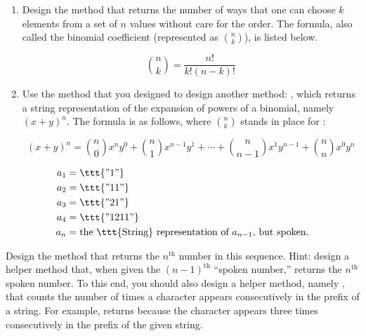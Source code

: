 \begin{enumerate}[label=(\alph*)]
    \item Design the  method that returns the number of ways that one can choose $k$ elements from a set of $n$ values without care for the order. The formula, also called the binomial coefficient (represented as $\binom{n}{k}$), is listed below.
    
\[
    \binom{n}{k} = \dfrac{n!}{k!(n - k)!}
\]

    \item Use the  method that you designed to design another method: , which returns a string representation of the expansion of powers of a binomial, namely $(x + y)^n$. The formula is as follows, where $\binom{n}{k}$ stands in place for :

    \[
    (x + y)^n = \binom{n}{0}x^ny^0 + \binom{n}{1}x^{n-1}y^1 + \cdots + \binom{n}{n-1}x^1y^{n-1} + \binom{n}{n}x^0y^n
    \]
\end{enumerate}


\begin{align*}
    a_1 &= \ttt{"1"}\\
    a_2 &= \ttt{"11"}\\
    a_3 &= \ttt{"21"}\\
    a_4 &= \ttt{"1211"}\\
    a_n &= \text{the \ttt{String} representation of }a_{n-1}\text{, but spoken.}
\end{align*}

Design the  method that returns the $n^{\text{th}}$ number in this sequence. Hint: design a helper method that, when given the $(n-1)^{\text{th}}$ ``spoken number,'' returns the $n^{\text{th}}$ spoken number. To this end, you should also design a helper method, namely , that counts the number of times a character appears consecutively in the prefix of a string. For example,  returns  because the character  appears three times consecutively in the prefix of the given string.

